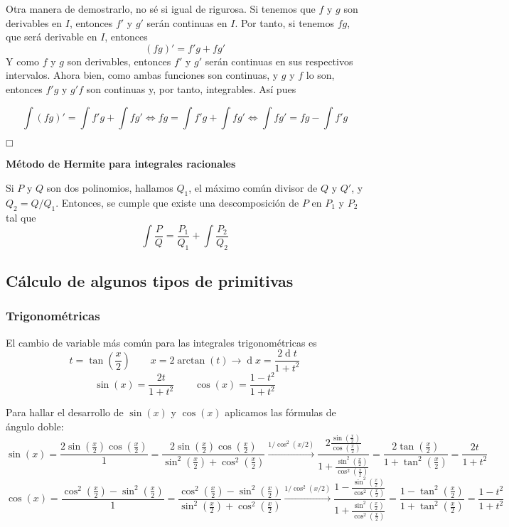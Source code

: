 \documentclass[a4paper]{article}
\renewcommand{\d}[1]{\ensuremath{\operatorname{d}\!{#1}}}
\newcommand{\qed}{\begin{flushright}
		{$\newline\square$}
	\end{flushright}}
\begin{document}
 Otra manera de demostrarlo, no sé si igual de rigurosa. Si tenemos que $f$ y $g$ son derivables en $I$, entonces $f'$ y $g'$ serán continuas en $I$. Por tanto, si tenemos $fg$, que será derivable en $I$, entonces
	$$(fg)' = f'g + fg'$$
	Y como $f$ y $g$ son derivables, entonces $f'$ y $g'$ serán continuas en sus respectivos intervalos. Ahora bien, como ambas funciones son continuas, y $g$ y $f$ lo son, entonces $f'g$ y $g'f$ son continuas y, por tanto, integrables. Así pues
	
	$$\int(fg)' = \int f'g + \int fg' \iff  fg =  \int f'g + \int fg' \iff \int fg' = fg - \int f'g$$\qed


\textbf{Método de Hermite para integrales racionales}

Si $P$ y $Q$ son dos polinomios, hallamos $Q_1$, el máximo común divisor de $Q$ y $Q'$, y $Q_2 = Q/Q_1$. Entonces, se cumple que existe una descomposición de $P$ en $P_1$ y $P_2$ tal que 
$$\int \frac{P}{Q} = \frac{P_1}{Q_1} + \int \frac{P_2}{Q_2}$$

\subsection*{Cálculo de algunos tipos de primitivas}
\subsubsection*{Trigonométricas}
El cambio de variable más común para las integrales trigonométricas es
$$t = \tan\left(\frac{x}{2}\right) \qquad x = 2\arctan(t) \rightarrow \d{x} = \frac{2\d{t}}{1+t^2}$$
$$\sin(x) = \frac{2t}{1+t^2} \qquad \cos(x) = \frac{1-t^2}{1+t^2}$$

Para hallar el desarrollo de $\sin(x)$ y $\cos(x)$ aplicamos las fórmulas de ángulo doble:
$$\sin(x) = \frac{2\sin\left(\frac{x}{2}\right)\cos\left(\frac{x}{2}\right) }{1} = 
   \frac{2\sin\left(\frac{x}{2}\right)\cos\left(\frac{x}{2}\right) }{\sin^2\left(\frac{x}{2}\right)+\cos^2\left(\frac{x}{2}\right)} \xrightarrow{1/\cos^2(x/2)}
    \frac{2\frac{\sin\left(\frac{x}{2}\right)}{\cos\left(\frac{x}{2}\right)} }{1+\frac{\sin^2\left(\frac{x}{2}\right)}{\cos^2\left(\frac{x}{2}\right)}} = 
   \frac{2\tan\left(\frac{x}{2}\right) }{1+\tan^2\left(\frac{x}{2}\right)} =  \frac{2t}{1+t^2} $$
$$\cos(x) = \frac{\cos^2\left(\frac{x}{2}\right) - \sin^2\left(\frac{x}{2}\right)}{1} = 
\frac{\cos^2\left(\frac{x}{2}\right) - \sin^2\left(\frac{x}{2}\right) }{\sin^2\left(\frac{x}{2}\right)+\cos^2\left(\frac{x}{2}\right)} \xrightarrow{1/\cos^2(x/2)}
\frac{1-\frac{\sin^2\left(\frac{x}{2}\right)}{\cos^2\left(\frac{x}{2}\right)} }{1+\frac{\sin^2\left(\frac{x}{2}\right)}{\cos^2\left(\frac{x}{2}\right)}} = 
\frac{1-\tan^2\left(\frac{x}{2}\right)}{1+\tan^2\left(\frac{x}{2}\right)} =  \frac{1-t^2}{1+t^2} $$
\end{document}
